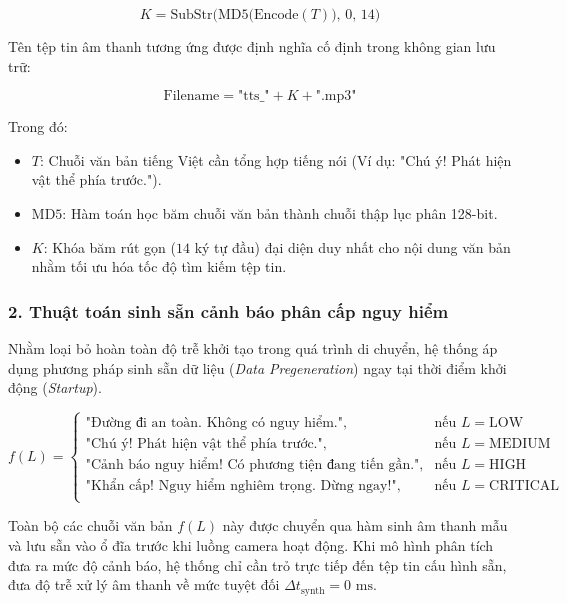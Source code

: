 \begin{equation}
    K = \text{SubStr}\Big(\text{MD5}\big(\text{Encode}(T)\big), \, 0, \, 14\Big)
\end{equation}

Tên tệp tin âm thanh tương ứng được định nghĩa cố định trong không gian lưu trữ:

\begin{equation}
    \text{Filename} = \text{"tts\_"} + K + \text{".mp3"}
\end{equation}

Trong đó:
\begin{itemize}
    \item $T$: Chuỗi văn bản tiếng Việt cần tổng hợp tiếng nói (Ví dụ: "Chú ý! Phát hiện vật thể phía trước.").
    \item $\text{MD5}$: Hàm toán học băm chuỗi văn bản thành chuỗi thập lục phân 128-bit.
    \item $K$: Khóa băm rút gọn ($14$ ký tự đầu) đại diện duy nhất cho nội dung văn bản nhằm tối ưu hóa tốc độ tìm kiếm tệp tin.
\end{itemize}

\subsubsection*{2. Thuật toán sinh sẵn cảnh báo phân cấp nguy hiểm}

Nhằm loại bỏ hoàn toàn độ trễ khởi tạo trong quá trình di chuyển, hệ thống áp dụng phương pháp sinh sẵn dữ liệu (\textit{Data Pregeneration}) ngay tại thời điểm khởi động (\textit{Startup}).

\begin{equation}
    f(L) = \begin{cases} 
        \text{"Đường đi an toàn. Không có nguy hiểm."}, & \text{nếu } L = \text{LOW} \\
        \text{"Chú ý! Phát hiện vật thể phía trước."}, & \text{nếu } L = \text{MEDIUM} \\
        \text{"Cảnh báo nguy hiểm! Có phương tiện đang tiến gần."}, & \text{nếu } L = \text{HIGH} \\
        \text{"Khẩn cấp! Nguy hiểm nghiêm trọng. Dừng ngay!"}, & \text{nếu } L = \text{CRITICAL} \\
    \end{cases}
\end{equation}

Toàn bộ các chuỗi văn bản $f(L)$ này được chuyển qua hàm sinh âm thanh mẫu và lưu sẵn vào ổ đĩa trước khi luồng camera hoạt động. Khi mô hình phân tích đưa ra mức độ cảnh báo, hệ thống chỉ cần trỏ trực tiếp đến tệp tin cấu hình sẵn, đưa độ trễ xử lý âm thanh về mức tuyệt đối $\Delta t_{\text{synth}} = 0 \text{ ms}$.

